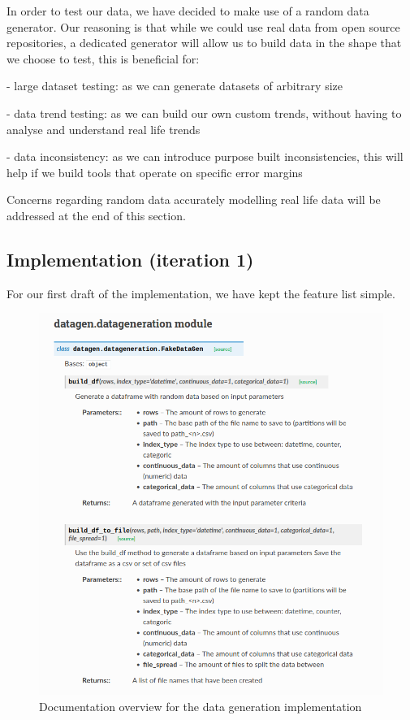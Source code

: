In order to test our data, we have decided to make use of a random data generator.
Our reasoning is that while we could use real data from open source repositories, a dedicated generator will allow us
to build data in the shape that we choose to test, this is beneficial for:

- large dataset testing: as we can generate datasets of arbitrary size

- data trend testing: as we can build our own custom trends, without having to analyse and understand real life trends

- data inconsistency: as we can introduce purpose built inconsistencies, this will help if we build tools that operate on specific error margins

Concerns regarding random data accurately modelling real life data will be addressed at the end of this section.

\subsection{Implementation (iteration 1)}\label{subsec:implementation-(iteration-1)}
For our first draft of the implementation, we have kept the feature list simple.

\begin{figure}[h]
    \centering
    \includegraphics[width=12cm]{figures/data_generation/datagen_doc_v1}
    \caption{Documentation overview for the data generation implementation}
    \label{fig:datagen_doc_1}
\end{figure}


